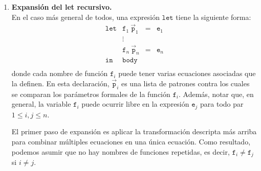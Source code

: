 \begin{enumerate}
  \item {\bf Expansión del let recursivo.} \\
    En el caso más general de todos, una expresión $\texttt{let}$ tiene la siguiente forma:
    \[
    \begin{array}{rlll}
        \texttt{let} & \texttt{f$_1$}\ \vec{\texttt{p}}_1 & = & \texttt{e$_1$} \\
        & \vdots & \\
                     & \texttt{f$_n$}\ \vec{\texttt{p}}_n & = & \texttt{e$_n$} \\
         \texttt{in} & \texttt{body}  &\\
    \end{array}
    \]
    donde cada nombre de función $\texttt{f}_i$ puede tener varias ecuaciones
    asociadas que la definen. En esta declaración, $\vec{\texttt{p}}_i$ es una lista de patrones
    contra los cuales se comparan los parámetros formales de la función
    $\texttt{f}_i$. Además, notar que, en general,
    la variable $\texttt{f}_i$ puede ocurrir libre en la expresión $\texttt{e}_j$
    para todo par $1 \leq i,j \leq n$.

    El primer paso de expansión es aplicar la transformación descripta más
    arriba para combinar múltiples ecuaciones en una única ecuación.
    Como resultado, podemos asumir que no hay nombres de funciones repetidas, es decir,
    $\texttt{f}_i \neq \texttt{f}_j$ si $i \neq j$.


\end{enumerate}
